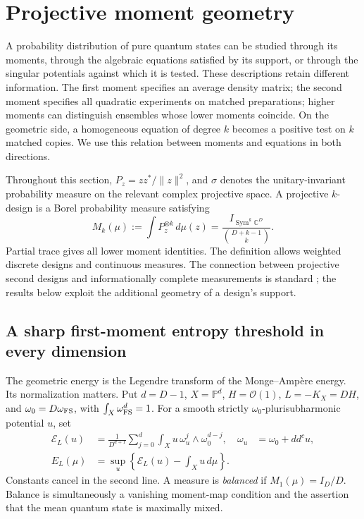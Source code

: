 \section{Projective moment geometry}
\label{geo:section}

A probability distribution of pure quantum states can be studied through its
moments, through the algebraic equations satisfied by its support, or through
the singular potentials against which it is tested. These descriptions retain
different information. The first moment specifies an average density matrix;
the second moment specifies all quadratic experiments on matched preparations;
higher moments can distinguish ensembles whose lower moments coincide. On the
geometric side, a homogeneous equation of degree \(k\) becomes a positive test
on \(k\) matched copies. We use this relation between moments and equations
in both directions.

Throughout this section, \(P_z=zz^*/\|z\|^2\), and \(\sigma\) denotes the
unitary-invariant probability measure on the relevant complex projective
space. A projective \(k\)-design is a Borel probability measure satisfying
\begin{equation}
 M_k(\mu):=\int P_z^{\otimes k}\,d\mu(z)
 =\frac{I_{\operatorname{Sym}^k\mathbb C^D}}
 {\binom{D+k-1}{k}}.
 \label{geo:design}
\end{equation}
Partial trace gives all lower moment identities. The definition allows
weighted discrete designs and continuous measures. The connection between
projective second designs and informationally complete measurements is
standard \cite{geo_scott2006}; the results below exploit the additional
geometry of a design's support.

\subsection{A sharp first-moment entropy threshold in every dimension}
\label{geo:threshold}

The geometric energy is the Legendre transform of the Monge--Amp\`ere
energy. Its normalization matters. Put \(d=D-1\), \(X=\mathbb P^d\),
\(H=\mathcal O(1)\), \(L=-K_X=DH\), and \(\omega_0=D\omega_{\rm FS}\), with
\(\int_X\omega_{\rm FS}^d=1\). For a smooth strictly
\(\omega_0\)-plurisubharmonic potential \(u\), set
\begin{align}
 \mathcal E_L(u)
 &=\frac{1}{D^{d+1}}\sum_{j=0}^{d}
       \int_Xu\,\omega_u^j\wedge\omega_0^{d-j},
 &\omega_u&=\omega_0+dd^cu,\\
 E_L(\mu)
 &=\sup_u\left\{\mathcal E_L(u)-\int_Xu\,d\mu\right\}.
 \label{geo:energy}
\end{align}
Constants cancel in the second line. A measure is \emph{balanced} if
\(M_1(\mu)=I_D/D\). Balance is simultaneously a vanishing moment-map
condition and the assertion that the mean quantum state is maximally mixed.

